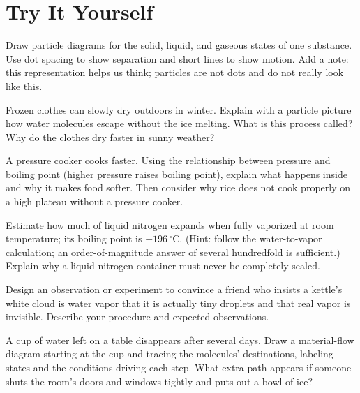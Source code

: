\section*{Try It Yourself}

\begin{sikaoti}
\item Draw particle diagrams for the solid, liquid, and gaseous states of one substance. Use dot spacing to show separation and short lines to show motion. Add a note: this representation helps us think; particles are not dots and do not really look like this.
\item Frozen clothes can slowly dry outdoors in winter. Explain with a particle picture how water molecules escape without the ice melting. What is this process called? Why do the clothes dry faster in sunny weather?
\item A pressure cooker cooks faster. Using the relationship between pressure and boiling point (higher pressure raises boiling point), explain what happens inside and why it makes food softer. Then consider why rice does not cook properly on a high plateau without a pressure cooker.
\item Estimate how much  of liquid nitrogen expands when fully vaporized at room temperature; its boiling point is $-196\,^{\circ}\mathrm{C}$. (Hint: follow the water-to-vapor calculation; an order-of-magnitude answer of several hundredfold is sufficient.) Explain why a liquid-nitrogen container must never be completely sealed.
\item Design an observation or experiment to convince a friend who insists a kettle's white cloud is water vapor that it is actually tiny droplets and that real vapor is invisible. Describe your procedure and expected observations.
\item A cup of water left on a table disappears after several days. Draw a material-flow diagram starting at the cup and tracing the molecules' destinations, labeling states and the conditions driving each step. What extra path appears if someone shuts the room's doors and windows tightly and puts out a bowl of ice?
\end{sikaoti}
